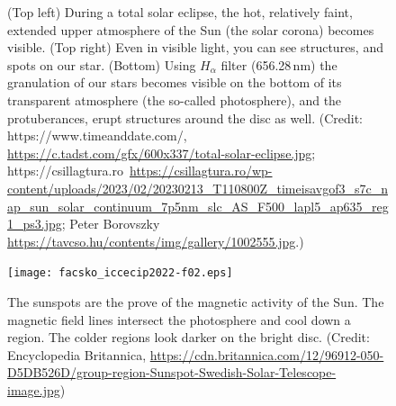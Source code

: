\documentclass[sn-aps]{sn-jnl}%
\begin{document}
\begin{figure}[h]
\caption{(Top left) During a total solar eclipse, the hot, relatively faint, extended upper atmosphere of the Sun (the solar corona) becomes visible. (Top right) Even in visible light, you can see structures, and spots on our star. (Bottom) Using $H_{\alpha}$ filter (656.28\,nm) the granulation of our stars becomes visible on the bottom of its transparent atmosphere (the so-called photosphere), and the protuberances, erupt structures around the disc as well. (Credit: https://www.timeanddate.com/, \url{https://c.tadst.com/gfx/600x337/total-solar-eclipse.jpg}; https://csillagtura.ro~\url{https://csillagtura.ro/wp-content/uploads/2023/02/20230213_T110800Z_timeisavgof3_s7c_nap_sun_solar_continuum_7p5nm_slc_AS_F500_lapl5_ap635_reg1_ps3.jpg}; Peter Borovszky \url{https://tavcso.hu/contents/img/gallery/1002555.jpg}.)}\label{fig:sunvisible}
\end{figure}


\begin{figure}[h]
\centering
\texttt{[image: facsko\_iccecip2022-f02.eps]}
\caption{The sunspots are the prove of the magnetic activity of the Sun. The magnetic field lines intersect the photosphere and cool down a region. The colder regions look darker on the bright disc. (Credit: Encyclopedia Britannica, \url{https://cdn.britannica.com/12/96912-050-D5DB526D/group-region-Sunspot-Swedish-Solar-Telescope-image.jpg})}\label{fig:sunspot}
\end{figure}
\end{document}
